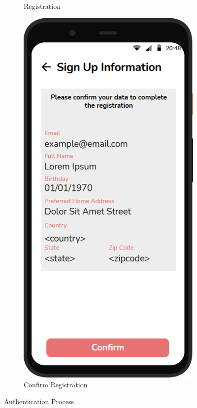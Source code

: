 \begin{figure}[H]
\begin{subfigure}{.33\textwidth}
        \caption{Registration}
        \label{fig:screen2}
    \end{subfigure}
    \begin{subfigure}{.33\textwidth}
        \centering
        \includegraphics[width=.95\linewidth]{Images/screen_03.png}
        \caption{Confirm Registration}
        \label{fig:screen3}
    \end{subfigure}
    \caption{Authentication Process}
\end{figure}
\clearpage

